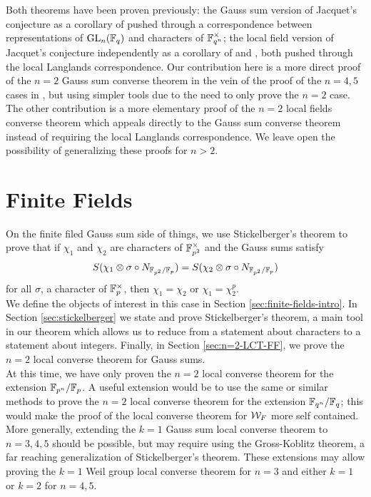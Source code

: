 Both theorems have been proven previously: the Gauss sum version of Jacquet's conjecture as a corollary of  \cite{Nien2014} pushed through a correspondence between representations of $\textrm{GL}_n(\mathbb{F}_q)$ and characters of $\mathbb{F}_{q^n}^\times$; the local field version of Jacquet's conjecture independently as a corollary of \cite{Jacquet2017} and \cite{Chai2016}, both pushed through the local Langlands correspondence.
Our contribution here is a more direct proof of the $n=2$ Gauss sum converse theorem in the vein of the proof of the $n = 4, 5$ cases in  \cite{Nien2018}, but using simpler tools due to the need to only prove the $n=2$ case.
The other contribution is a more elementary proof of the $n=2$ local fields converse theorem which appeals directly to the Gauss sum converse theorem instead of requiring the local Langlands correspondence.
We leave open the possibility of generalizing these proofs for $n > 2$.
\\

\section{Finite Fields}
On the finite filed Gauss sum side of things, we use Stickelberger's theorem to prove that if $\chi_1$ and $\chi_2$ are characters of $\mathbb{F}_{p^2}^\times$ and the Gauss sums satisfy
\[S(\chi_1 \otimes \sigma \circ N_{\mathbb{F}_{p^2} / \mathbb{F}_p}) = S(\chi_2 \otimes \sigma \circ N_{\mathbb{F}_{p^2} / \mathbb{F}_p})\]
for all $\sigma$, a character of $\mathbb{F}_p^\times$, then $\chi_1 = \chi_2$ or $\chi_1 = \chi_2^p$.
\\

We define the objects of interest in this case in Section \ref{sec:finite-fields-intro}.
In Section \ref{sec:stickelberger} we state and prove Stickelberger's theorem, a main tool in our theorem which allows us to reduce from a statement about characters to a statement about integers.
Finally, in Section \ref{sec:n=2-LCT-FF}, we prove the $n=2$ local converse theorem for Gauss sums.
\\

At this time, we have only proven the $n=2$ local converse theorem for the extension $\mathbb{F}_{p^n}/\mathbb{F}_{p}$.
A useful extension would be to use the same or similar methods to prove the $n=2$ local converse theorem for the extension $\mathbb{F}_{q^n}/\mathbb{F}_q$; this would make the proof of the local converse theorem for $\mathcal{W}_F$ more self contained.
More generally, extending the $k = 1$ Gauss sum local converse theorem to $n = 3,4,5$ should be possible, but may require using the Gross-Koblitz theorem, a far reaching generalization of Stickelberger's theorem.
These extensions may allow proving the $k = 1$ Weil group local converse theorem for $n = 3$ and either $k = 1$ or $k =2 $ for $n = 4,5$.
\\

